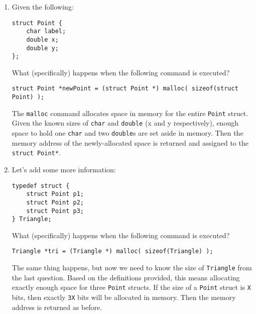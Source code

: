 \begin{enumerate}
\item Given the following:
\begin{lstlisting}[numbers=none]
struct Point {
	char label;
	double x;
	double y;
};
\end{lstlisting}

What (specifically) happens when the following command is executed?

\hspace{15mm} \texttt{struct Point *newPoint = (struct Point *) malloc( sizeof(struct Point) );}

\begin{answer}
The \texttt{malloc} command allocates space in memory for the entire \texttt{Point} struct.
Given the known sizes of \texttt{char} and \texttt{double} (x and y respectively), enough space to hold one \texttt{char} and two \texttt{double}s are set aside in memory.
Then the memory address of the newly-allocated space is returned and assigned to the \texttt{struct Point*}.
\end{answer}

\item Let's add some more information:
\begin{lstlisting}[numbers=none]
typedef struct {
	struct Point p1;
	struct Point p2;
	struct Point p3;
} Triangle;
\end{lstlisting}

What (specifically) happens when the following command is executed?

\hspace{15mm} \texttt{Triangle *tri = (Triangle *) malloc( sizeof(Triangle) );}

\begin{answer}
The same thing happens, but now we need to know the size of \texttt{Triangle} from the last question.
Based on the definitions provided, this means allocating exactly enough space for three \texttt{Point} structs.
If the size of a \texttt{Point} struct is \texttt{X} bits, then exactly \texttt{3X} bits will be allocated in memory.
Then the memory address is returned as before.
\end{answer}
\end{enumerate}
